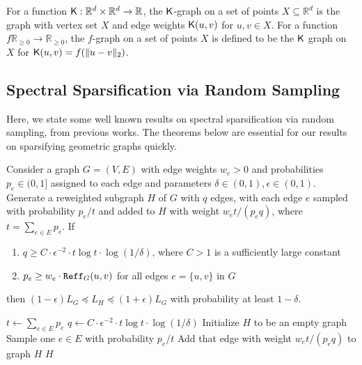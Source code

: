 For a function $\mathsf{K}:\mathbb{R}^d\times \mathbb{R}^d\rightarrow \mathbb{R}$, the $\mathsf{K}$-graph on a set of points $X\subseteq \mathbb{R}^d$ is the graph with vertex set $X$ and edge weights $\mathsf{K}(u,v)$ for $u,v\in X$. For a function $f\mathbb{R}_{\ge 0}\rightarrow \mathbb{R}_{\ge 0}$, the $f$-graph on a set of points $X$ is defined to be the $\mathsf{K}$ graph on $X$ for $\mathsf{K}(u,v) = f(\|u-v\|_2)$.


\subsection{Spectral Sparsification via Random Sampling}



Here, we state some well known results on spectral sparsification via random sampling, from previous works. The theorems below are essential for our results on sparsifying geometric graphs quickly.

\begin{theorem}\label{thm:oversampling}
Consider a graph $G = (V,E)$ with edge weights $w_e > 0$ and probabilities $p_e\in (0,1]$ assigned to each edge and parameters $\delta \in (0,1),\epsilon\in (0,1)$. Generate a reweighted subgraph $H$ of $G$ with $q$ edges, with each edge $e$ sampled with probability $p_e/t$ and added to $H$ with weight $w_e t/(p_e q)$, where $t = \sum_{e \in E} p_e$. If
\begin{enumerate}
    \item $q\ge C \cdot \epsilon^{-2} \cdot t\log t \cdot \log (1/\delta)$, where $C > 1$ is a sufficiently large constant
    \item $p_e\ge w_e \cdot \mathtt{Reff}_G(u,v)$ for all edges $e = \{u,v\}$ in $G$
\end{enumerate}
then $(1 - \epsilon) L_G \preceq L_H \preceq (1 + \epsilon) L_G$ with probability at least $1 - \delta$.
\end{theorem}

\begin{algorithm}
\begin{algorithmic}[1]\caption{}
 
    \State $t \leftarrow \sum_{e \in E} p_e$
    \State $q \leftarrow C \cdot \epsilon^{-2} \cdot t \log t \cdot \log(1/\delta)$
    \State Initialize $H$ to be an empty graph
        \State Sample one $e \in E$ with probability $p_e/t$
        \State Add that edge with weight $w_e t / (p_e q)$ to graph $H$
    \EndFor
    \State \Return $H$
\EndProcedure
\end{algorithmic}
\end{algorithm}



